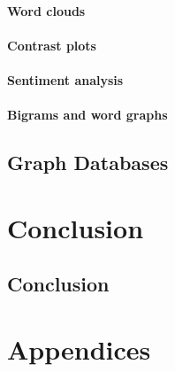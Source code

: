 \documentclass[
]{book}
\begin{document}
\hypertarget{word-clouds}{%
\subsection{Word clouds}\label{word-clouds}}

\hypertarget{contrast-plots}{%
\subsection{Contrast plots}\label{contrast-plots}}

\hypertarget{sentiment-analysis}{%
\subsection{Sentiment analysis}\label{sentiment-analysis}}

\hypertarget{bigrams-and-word-graphs}{%
\subsection{Bigrams and word graphs}\label{bigrams-and-word-graphs}}

\hypertarget{graph_dbs}{%
\chapter{Graph Databases}\label{graph_dbs}}

\hypertarget{part-conclusion}{%
\part*{Conclusion}\label{part-conclusion}}

\hypertarget{conclusion}{%
\chapter{Conclusion}\label{conclusion}}

\hypertarget{part-appendices}{%
\part*{Appendices}\label{part-appendices}}

  
\end{document}
